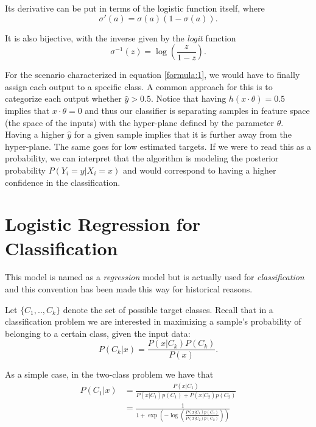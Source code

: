 Its derivative can be put in terms of the logistic function itself, where
\begin{equation}\label{eq:derivativeLogisticFunction}
\sigma '(a) = \sigma(a)( 1 - \sigma(a) ) .
\end{equation}

It is also bijective, with the inverse given by the \textit{logit} function
\begin{equation}\label{eq:logitFunction}
\sigma^{-1}(z) = \log \left( \frac{z}{1 - z} \right) .
\end{equation}

For the scenario characterized in equation \cref{formula:1}, we would have to finally assign each output to a specific class. A common approach for this is to categorize each output whether $\hat{y} > 0.5$\label{formula:logitThreshold}. Notice that having $h(x \cdot \theta) = 0.5$ implies that $x \cdot \theta = 0$ and thus our classifier is separating samples in feature space (the space of the inputs) with the hyper-plane defined by the parameter $\theta$. Having a higher $\hat{y}$ for a given sample implies that it is further away from the hyper-plane. The same goes for low estimated targets. If we were to read this as a probability, we can interpret that the algorithm is modeling the posterior probability $P(Y_i = y | X_i = x)$ and would correspond to having a higher confidence in the classification.




\section{Logistic Regression for Classification}\label{section-logisticRegression}

This model is named as a \textit{regression} model but is actually used for \textit{classification} and this convention has been made this way for historical reasons.


Let $\{C_1,..,C_k\}$ denote the set of possible target classes. Recall that in a classification problem we are interested in maximizing a sample's probability of belonging to a certain class, given the input data:
\begin{equation}
P(C_k| x) = \frac{P(x|C_k)P(C_k)}{P(x)} .
\end{equation}

As a simple case, in the two-class problem we have that
\begin{equation}
\begin{split}
P(C_1| x) & = \frac{P(x|C_1) }{P(x|C_1)p(C_1) + P(x|C_2)p(C_2)} \\
& = \frac{1 }
{1 + \exp \left(- \log \left(  \frac{ P(x|C_1)p(C_1)}
{P(x|C_2)p(C_2)
} \right) \right)
}
\end{split}
\end{equation}

